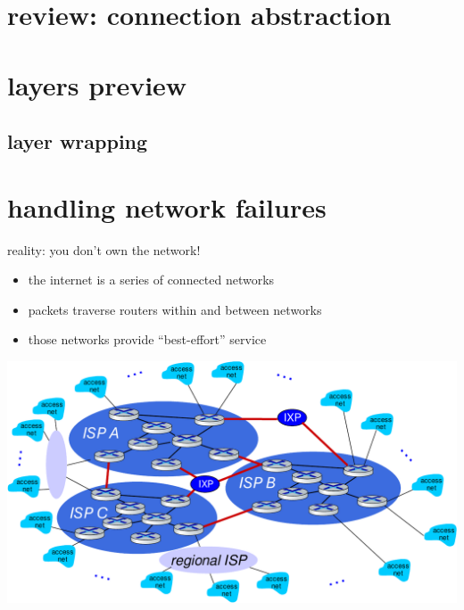 \section{review: connection abstraction}



\section{layers preview}


\subsection{layer wrapping}


\section{handling network failures}

\begin{frame}{reality: you don't own the network!}
    \begin{itemize}
    \item the internet is a series of connected networks
    \item packets traverse routers within and between networks
    \item those networks provide ``best-effort'' service
    \end{itemize}
    \begin{center}
        \includegraphics[width=0.4\pagewidth]{network-of-network}
    \end{center}
\end{frame}



